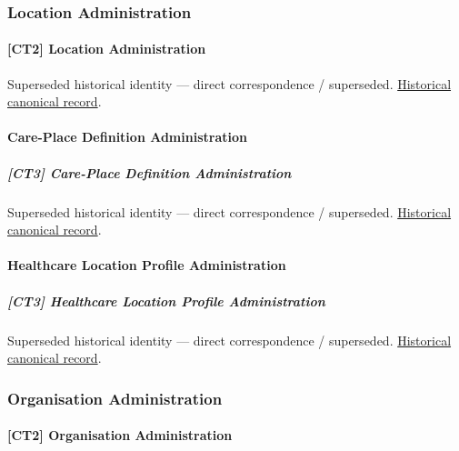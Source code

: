 \subsubsection{Location Administration}

\paragraph{[CT2] Location Administration}

\par\label{element:d412aff3a5c64e6aaba910d4c2c9356d}
Superseded historical identity — direct correspondence / superseded. \href{../../../../continuum/strategy/capability/d412aff3a5c64e6aaba910d4c2c9356d.md}{Historical canonical record}.\par

\paragraph{Care-Place Definition Administration}

\subparagraph{[CT3] Care-Place Definition Administration}

\par\label{element:a3464bd9c0dc4a01b50803acc7705b4e}
Superseded historical identity — direct correspondence / superseded. \href{../../../../continuum/strategy/capability/a3464bd9c0dc4a01b50803acc7705b4e.md}{Historical canonical record}.\par

\paragraph{Healthcare Location Profile Administration}

\subparagraph{[CT3] Healthcare Location Profile Administration}

\par\label{element:8a04d1f16d0849e786d2aaec33e0ba87}
Superseded historical identity — direct correspondence / superseded. \href{../../../../continuum/strategy/capability/8a04d1f16d0849e786d2aaec33e0ba87.md}{Historical canonical record}.\par

\subsubsection{Organisation Administration}

\paragraph{[CT2] Organisation Administration}

